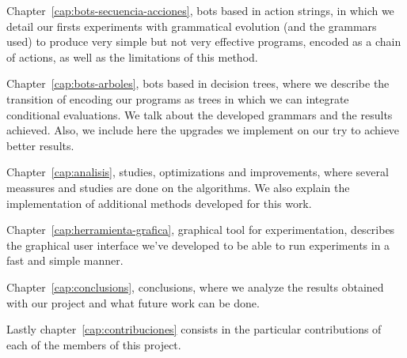 Chapter~\ref{cap:bots-secuencia-acciones}, bots based in action strings, in which we detail our firsts experiments with grammatical evolution (and the grammars used) to produce very simple but not very effective programs, encoded as a chain of actions, as well as the limitations of this method.

Chapter~\ref{cap:bots-arboles}, bots based in decision trees, where we describe the transition of encoding our programs as trees in which we can integrate conditional evaluations. We talk about the developed grammars and the results achieved. Also, we include here the upgrades we implement on our try to achieve better results.

Chapter~\ref{cap:analisis}, studies, optimizations and improvements, where several meassures and studies are done on the algorithms. We also explain the implementation of additional methods developed for this work.

Chapter~\ref{cap:herramienta-grafica}, graphical tool for experimentation, describes the graphical user interface we’ve developed to be able to run experiments in a fast and simple manner.

Chapter~\ref{cap:conclusions}, conclusions, where we analyze the results obtained with our project and what future work can be done.

Lastly chapter~\ref{cap:contribuciones} consists in the particular contributions of each of the members of this project.
